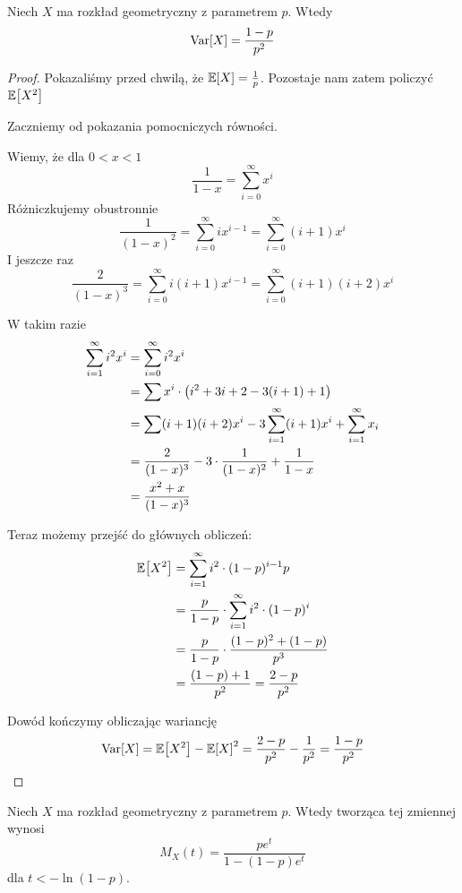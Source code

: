 \begin{theorem}
	Niech \( X \) ma rozkład geometryczny z parametrem \( p \). Wtedy
	\[
		\variance{X} = \frac{1 - p}{p^2}
	\]
\end{theorem}
\begin{proof}
	Pokazaliśmy przed chwilą, że \( \expected{X} = \frac{1}{p} \). Pozostaje nam zatem policzyć \( \expected{X^2} \)

	Zaczniemy od pokazania pomocniczych równości.

	Wiemy, że dla \( 0 < x < 1 \)
	\[
		\frac{1}{1-x} = \sum_{i=0}^\infty x^i
	\]
	Różniczkujemy obustronnie
	\[
		\frac{1}{(1-x)^2} = \sum_{i=0}^\infty i x^{i-1} = \sum_{i=0}^\infty (i+1)x^i
	\]
	I jeszcze raz
	\[
		\frac{2}{(1-x)^3} = \sum_{i=0}^\infty i (i+1) x^{i-1}
		= \sum_{i=0}^\infty (i+1)(i+2)x^i
	\]

	W takim razie
	\begin{align*}
		\sum_{i=1}^\infty i^2 x^i & = \sum_{i=0}^\infty i^2 x^i                                                \\
		                          & = \sum x^i \cdot \left(i^2 + 3i + 2 - 3(i + 1) + 1\right)                        \\
		                          & = \sum (i+1)(i+2)x^i - 3\sum_{i=1}^\infty (i+1)x^i + \sum_{i=1}^\infty x_i \\
		                          & = \frac{2}{(1-x)^3} - 3\cdot\frac{1}{(1-x)^2} + \frac{1}{1-x}              \\
		                          & = \frac{x^2 + x}{(1-x)^3}
	\end{align*}

	Teraz możemy przejść do głównych obliczeń:
	\begin{align*}
		\expected{X^2}
		 & = \sum_{i=1}^\infty i^2 \cdot (1-p)^{i-1} p                 \\
		 & = \frac{p}{1 - p} \cdot \sum_{i=1}^\infty i^2 \cdot (1-p)^i \\
		 & = \frac{p}{1-p}\cdot\frac{(1-p)^2 + (1-p)}{p^3}             \\
		 & = \frac{(1-p) + 1}{p^2} = \frac{2 - p}{p^2}
	\end{align*}

	Dowód kończymy obliczając wariancję
	\[
		\variance{X} = \expected{X^2} - \expected{X}^2 = \frac{2-p}{p^2} - \frac{1}{p^2} = \frac{1-p}{p^2}
	\]
\end{proof}

\begin{theorem}
	Niech \( X \) ma rozkład geometryczny z parametrem \( p \). Wtedy tworząca tej zmiennej wynosi
	\[
		M_X(t) = \frac{pe^t}{1 - (1-p)e^t}
	\]
	dla \( t < -\ln (1-p) \).
\end{theorem}

